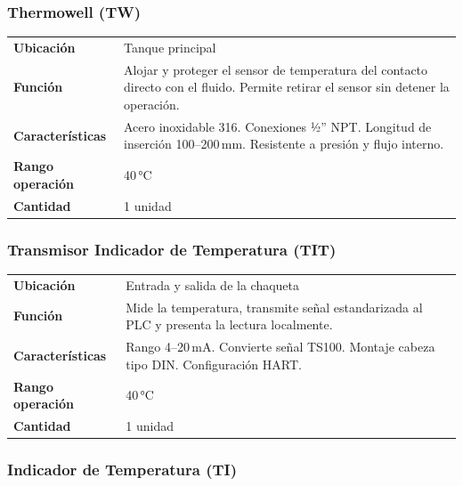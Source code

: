 \documentclass[12pt,letterpaper]{article}
\begin{document}
\subsubsection{Thermowell (TW)}

\begin{especbox}[title={TW — WIKA TW10}]
\renewcommand{\arraystretch}{1.25}
\begin{tabular}{L{4cm} L{9.5cm}}
\textbf{Ubicación}       & Tanque principal \\
\textbf{Función}         & Alojar y proteger el sensor de temperatura del contacto directo con el fluido. Permite retirar el sensor sin detener la operación. \\
\textbf{Características} & Acero inoxidable 316. Conexiones ½'' NPT. Longitud de inserción 100--200\,mm. Resistente a presión y flujo interno. \\
\textbf{Rango operación} & 40\,°C \\
\textbf{Cantidad}        & 1 unidad \\
\end{tabular}
\end{especbox}

\subsubsection{Transmisor Indicador de Temperatura (TIT)}

\begin{especbox}[title={TIT — Siemens SITRANS TH320}]
\renewcommand{\arraystretch}{1.25}
\begin{tabular}{L{4cm} L{9.5cm}}
\textbf{Ubicación}       & Entrada y salida de la chaqueta \\
\textbf{Función}         & Mide la temperatura, transmite señal estandarizada al PLC y presenta la lectura localmente. \\
\textbf{Características} & Rango 4--20\,mA. Convierte señal TS100. Montaje cabeza tipo DIN. Configuración HART. \\
\textbf{Rango operación} & 40\,°C \\
\textbf{Cantidad}        & 1 unidad \\
\end{tabular}
\end{especbox}

\subsubsection{Indicador de Temperatura (TI)}
\end{document}
